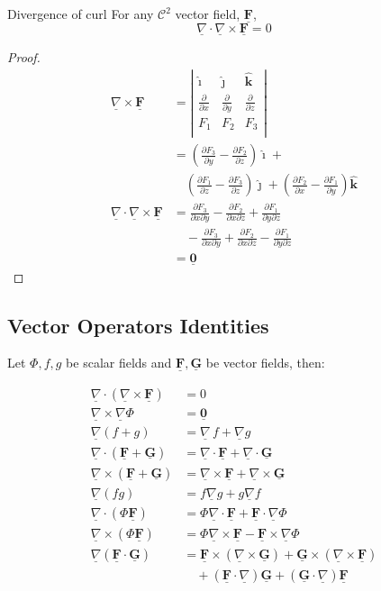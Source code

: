 \documentclass{article}
\renewcommand{\vec}[1]{\underline{\textbf{#1}}}
\newcommand{\veci}{\bm{\hat{\imath}}}
\newcommand{\vecj}{\bm{\hat{\jmath}}}
\newcommand{\veck}{\bm{\hat{k}}}
\newcommand{\p}{\Phi}
\newcommand{\pa}{\partial}
\newcommand{\nab}{\underline{\nabla}}
\newcommand{\grad}{{\nab}\, f}
\newcommand{\pd}[2]{\frac{\partial #1}{\partial #2}}
\renewcommand{\div}{\nab \cdot}
\newcommand{\curl}{\nab \times}
\begin{document}
\noindent\begin{theorem}{Divergence of curl}{}
 For any $\mathcal{C}^2$ vector field, $\vec F$,
 $$ \div \curl \vec F = 0 $$
\end{theorem}\vspace{10pt}
\begin{proof}
  \begin{align*}
    \curl \vec F &= \left|\begin{matrix}
      \veci & \vecj & \veck \\
      \pd{}{x} & \pd{}{y} & \pd{}{z} \\
      F_1 & F_2 & F_3 \\
    \end{matrix}\right|\\
  &= \left( \pd{F_3}{y} - \pd{F_2}{z} \right)\veci +\\
  &\quad \left(\pd{F_1}{z} - \pd{F_3}{z}\right)\vecj + \left(\pd{F_2}{x} - \pd{F_1}{y} \right)\veck\\
  \div\curl\vec F &= \pd{F_3}{x\pa y} - \pd{F_2}{x\pa z}+ \pd{F_1}{y \pa z}\\
  &\quad- \pd{F_3}{x \pa y} + \pd{F_2}{x \pa z} - \pd{F_1}{y \pa z}\\
  &= \vec 0
  \end{align*}
\end{proof}

\subsection{Vector Operators Identities}
Let $\p, f, g$ be scalar fields and $\vec F, \vec G$ be vector fields, then:

\begin{align}
  \div(\curl\vec F) &= 0\\
  \curl\nab\p &= \vec 0\\
  \nab(f + g) &= \grad + \nab g\\
  \div(\vec F + \vec G) &= \div\vec F + \div\vec G \\
  \curl(\vec F + \vec G) &= \curl\vec F + \curl\vec G\\
  \nab(fg) &= f\nab g + g\nab f\\
  \div(\p\vec F) &= \p\div\vec F + \vec F \cdot \nab\p\\
  \curl(\p\vec F) &= \p\curl\vec F - \vec F\times\nab\p \\
  \nab(\vec F \cdot\vec G) &= \vec F\times(\curl \vec G) + \vec G\times(\curl \vec F) \\
  &\quad + (\vec F \cdot\nab)\vec G + (\vec G \cdot \nab)\vec F\\
\end{align}
\end{document}
